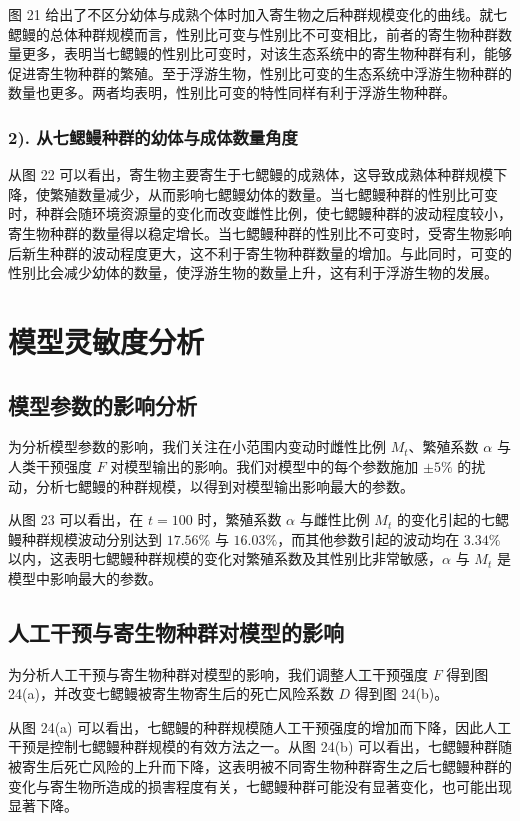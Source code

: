 \documentclass[11pt,a4paper]{ctexart}
\begin{document}
图 21 给出了不区分幼体与成熟个体时加入寄生物之后种群规模变化的曲线。就七鳃鳗的总体种群规模而言，性别比可变与性别比不可变相比，前者的寄生物种群数量更多，表明当七鳃鳗的性别比可变时，对该生态系统中的寄生物种群有利，能够促进寄生物种群的繁殖。至于浮游生物，性别比可变的生态系统中浮游生物种群的数量也更多。两者均表明，性别比可变的特性同样有利于浮游生物种群。

\subsubsection*{2). 从七鳃鳗种群的幼体与成体数量角度}

从图 22 可以看出，寄生物主要寄生于七鳃鳗的成熟体，这导致成熟体种群规模下降，使繁殖数量减少，从而影响七鳃鳗幼体的数量。当七鳃鳗种群的性别比可变时，种群会随环境资源量的变化而改变雌性比例，使七鳃鳗种群的波动程度较小，寄生物种群的数量得以稳定增长。当七鳃鳗种群的性别比不可变时，受寄生物影响后新生种群的波动程度更大，这不利于寄生物种群数量的增加。与此同时，可变的性别比会减少幼体的数量，使浮游生物的数量上升，这有利于浮游生物的发展。

\section{模型灵敏度分析}

\subsection{模型参数的影响分析}

为分析模型参数的影响，我们关注在小范围内变动时雌性比例 $M_t$、繁殖系数 $\alpha$ 与人类干预强度 $F$ 对模型输出的影响。我们对模型中的每个参数施加 $\pm 5\%$ 的扰动，分析七鳃鳗的种群规模，以得到对模型输出影响最大的参数。

从图 23 可以看出，在 $t=100$ 时，繁殖系数 $\alpha$ 与雌性比例 $M_t$ 的变化引起的七鳃鳗种群规模波动分别达到 $17.56\%$ 与 $16.03\%$，而其他参数引起的波动均在 $3.34\%$ 以内，这表明七鳃鳗种群规模的变化对繁殖系数及其性别比非常敏感，$\alpha$ 与 $M_t$ 是模型中影响最大的参数。

\subsection{人工干预与寄生物种群对模型的影响}

为分析人工干预与寄生物种群对模型的影响，我们调整人工干预强度 $F$ 得到图 24(a)，并改变七鳃鳗被寄生物寄生后的死亡风险系数 $D$ 得到图 24(b)。

从图 24(a) 可以看出，七鳃鳗的种群规模随人工干预强度的增加而下降，因此人工干预是控制七鳃鳗种群规模的有效方法之一。从图 24(b) 可以看出，七鳃鳗种群随被寄生后死亡风险的上升而下降，这表明被不同寄生物种群寄生之后七鳃鳗种群的变化与寄生物所造成的损害程度有关，七鳃鳗种群可能没有显著变化，也可能出现显著下降。
\end{document}
